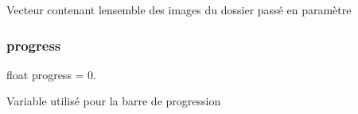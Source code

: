 Vecteur contenant l\textquotesingle{}ensemble des images du dossier passé en paramètre \mbox{\label{video-player_8cpp_ac7abb4766cd3f65c31f56279d7decff8}} 
\subsubsection{\texorpdfstring{progress}{progress}}
{\footnotesize\ttfamily float progress = 0.}

Variable utilisé pour la barre de progression 